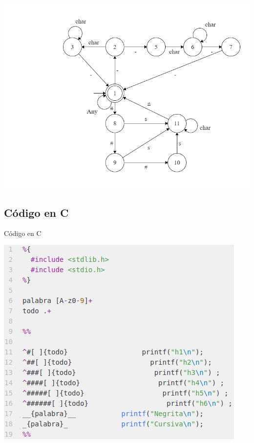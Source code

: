 \documentclass[11pt]{beamer}
\begin{document}
\begin{frame}[fragile]

\begin{center}

\includegraphics[scale=0.4]{imagenes/aufinal.png} 
\end{center}

\end{frame}

\subsection{Código en C}

\begin{frame}[fragile]{Código en C}

\begin{center}
\includegraphics[scale=0.55]{imagenes/code.png} 

\end{center}
\end{frame}
\end{document}

